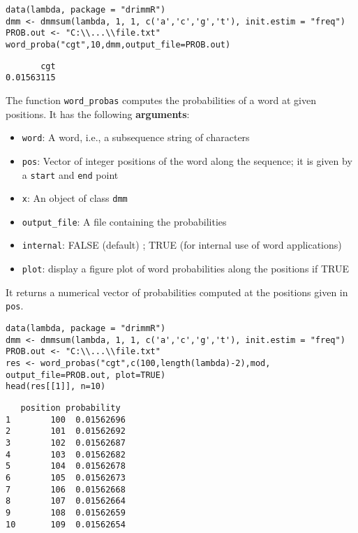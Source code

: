 \documentclass[article,nojss]{jss}\usepackage[]{graphicx}\usepackage[]{color}
\begin{document}
\begin{lstlisting}
data(lambda, package = "drimmR")
dmm <- dmmsum(lambda, 1, 1, c('a','c','g','t'), init.estim = "freq")
PROB.out <- "C:\\...\\file.txt"
word_proba("cgt",10,dmm,output_file=PROB.out)
\end{lstlisting}

\begin{lstlisting}
       cgt
0.01563115
\end{lstlisting}


The function \verb|word_probas| computes the probabilities of a word at given positions. It has the following {\bf arguments}:
%
\begin{itemize}
\item {\tt word}: A word, i.e., a subsequence string of characters
\item {\tt pos}: Vector of integer positions of the word along the sequence; it is given by a {\tt start} and {\tt end} point
\item {\tt x}: An object of class {\tt dmm}
\item {\tt output\_file}: A file containing the probabilities
\item {\tt internal}: FALSE (default) ; TRUE (for internal use of word applications)
\item {\tt plot}: display a figure plot of word probabilities along the positions if TRUE

\end{itemize}
%
It returns a numerical vector of probabilities computed at the positions given in {\tt pos}. \\



\begin{lstlisting}
data(lambda, package = "drimmR")
dmm <- dmmsum(lambda, 1, 1, c('a','c','g','t'), init.estim = "freq")
PROB.out <- "C:\\...\\file.txt"
res <- word_probas("cgt",c(100,length(lambda)-2),mod,
output_file=PROB.out, plot=TRUE)
head(res[[1]], n=10)
\end{lstlisting}


\begin{lstlisting}
   position probability
1        100  0.01562696
2        101  0.01562692
3        102  0.01562687
4        103  0.01562682
5        104  0.01562678
6        105  0.01562673
7        106  0.01562668
8        107  0.01562664
9        108  0.01562659
10       109  0.01562654
\end{lstlisting}
\end{document}
